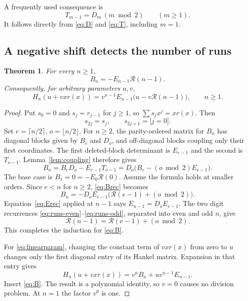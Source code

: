 \documentclass[11pt,a4paper]{article}
\numberwithin{equation}{section}
\newtheorem{theorem}{Theorem}[section]
\theoremstyle{definition}
\theoremstyle{remark}
\newcommand{\Runs}{\mathcal R}
\newcommand{\ind}[1]{\boldsymbol{[}#1\boldsymbol{]}}
\begin{document}
A frequently used consequence is
\begin{equation}\label{eq:Tspecial}
 T_{m-1}=D_m\,(m\bmod2)\qquad(m\ge1).
\end{equation}
It follows directly from \eqref{eq:D} and \eqref{eq:T}, including $m=1$.

\subsection{A negative shift detects the number of runs}

\begin{theorem}\label{thm:B}
For every $n\ge1$,
\begin{equation}\label{eq:B}
 B_n=-E_{n-1}\Runs(n-1).
\end{equation}
Consequently, for arbitrary parameters $u,v$,
\begin{equation}\label{eq:linearparam}
 H_n(u+v x r(x))
 =v^{n-1}E_{n-1}\bigl(u-v\Runs(n-1)\bigr),\qquad n\ge1.
\end{equation}
\end{theorem}
\begin{proof}
Put $s_0=0$ and $s_j=r_{j-1}$ for $j\ge1$, so $\sum s_jx^j=xr(x)$.
Then
\[
 s_{2j}=s_j,\qquad s_{2j+1}=\ind{j=0}.
\]
Set $e=\lceil n/2\rceil$, $o=\lfloor n/2\rfloor$. For $n\ge2$, the
parity-ordered matrix for $B_n$ has diagonal blocks given by $B_e$ and
$D_o$, and off-diagonal blocks coupling only their first coordinates.
The first deleted-block determinant is $E_{e-1}$ and the second is
$T_{o-1}$. Lemma~\ref{lem:coupling} therefore gives
\begin{equation}\label{eq:Brec}
 B_n=B_eD_o-E_{e-1}T_{o-1}
 =D_o\bigl(B_e-(o\bmod2)E_{e-1}\bigr).
\end{equation}
The base case is $B_1=0=-E_0\Runs(0)$. Assume the formula holds at
smaller orders. Since $e<n$ for $n\ge2$, \eqref{eq:Brec} becomes
\[
 B_n=-D_oE_{e-1}\bigl(\Runs(e-1)+(o\bmod2)\bigr).
\]
Equation~\eqref{eq:Erec} applied at $n-1$ says
$E_{n-1}=D_oE_{e-1}$. The two digit recurrences
\eqref{eq:runs-even}--\eqref{eq:runs-odd}, separated into even and odd
$n$, give
\[
 \Runs(n-1)=\Runs(e-1)+(o\bmod2).
\]
This completes the induction for \eqref{eq:B}.

For \eqref{eq:linearparam}, changing the constant term of $v x r(x)$
from zero to $u$ changes only the first diagonal entry of its Hankel
matrix. Expansion in that entry gives
\[
 H_n(u+v x r(x))=v^nB_n+u v^{n-1}E_{n-1}.
\]
Insert \eqref{eq:B}. The result is a polynomial identity, so $v=0$
causes no division problem. At $n=1$ the factor $v^0$ is one.
\end{proof}
\end{document}
